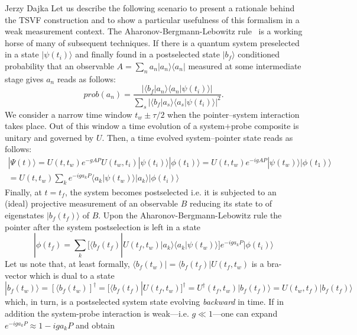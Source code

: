\begin{artengenv}{Jerzy Dajka}
Let us describe the following scenario to present a rationale behind the TSVF construction and to show a particular usefulness of this formalism in a weak measurement context. 
The Aharonov-Bergmann-Lebowitz rule~\parencite{abl} is a working horse of many of subsequent techniques. If there is a quantum system preselected in a state $|\psi(t_i)\rangle$ and finally found in  a postselected state $|b_f\rangle$ conditioned probability that an observable $A=\sum_n a_n|a_n\rangle\langle a_n|$ measured at some intermediate stage gives $a_n$ reads as follows:
\begin{equation}\label{abl}
    prob(a_n)=\frac{|\langle b_f|a_n\rangle\langle a_n|\psi(t_i)\rangle|}{\sum_s|\langle b_f|a_s\rangle\langle a_s|\psi(t_i)\rangle|^2}.
\end{equation}
We consider a narrow time window $t_w\pm\tau/2$ when the pointer--system interaction takes place. Out of this window a time evolution of a system+probe composite is unitary and governed by $U$. Then, a time evolved system--pointer state reads as follows: 
\begin{equation}
\begin{split}
    |\Psi(t)\rangle= U(t,t_w) e^{-gAP} U(t_w,t_i) |\psi(t_i)\rangle|\phi(t_1)\rangle=U(t,t_w) e^{-igAP}|\psi(t_w)\rangle|\phi(t_1)\rangle\\
=U(t,t_w)\sum_k e^{-iga_kP}\langle a_k|\psi(t_w)\rangle |a_k\rangle |\phi(t_i)\rangle
\end{split}
\end{equation}
Finally, at $t=t_f$, the system becomes postselected i.e. it is subjected to an (ideal) projective measurement of an observable $B$ reducing its state to of eigenstates $|b_f(t_f)\rangle$ of $B$. Upon the Aharonov-Bergmann-Lebowitz rule the pointer after the system postselection is left in  a state
\begin{equation}
|\phi(t_f)=\sum_k[\langle b_f(t_f)|U(t_f,t_w)|a_k\rangle\langle a_k|\psi(t_w)\rangle]e^{-iga_kP}|\phi(t_i)\rangle      
\end{equation}
Let us note that, at least formally, $\langle b_f(t_w)|=\langle b_f(t_f)|U(t_f,t_w)$ is a bra-vector which is dual to a state  
$|b_f(t_w)\rangle=[\langle b_f(t_w)]^\dagger=[\langle b_f(t_f)|U(t_f,t_w)]^\dagger=U^\dagger(t_f,t_w)|b_f(t_f)\rangle=U(t_w,t_f)|b_f(t_f)\rangle$
which, in turn, is a postselected system state  
evolving {\it backward} in time.
 If in addition  the system-probe interaction is weak---i.e. $g\ll 1$---one can expand $e^{-iga_kP}\approx 1-iga_k P$ and obtain
\begin{equation}

\end{equation}
\end{artengenv}

